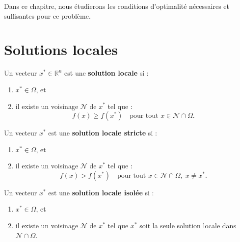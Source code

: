 Dans ce chapitre, nous étudierons les conditions d'optimalité nécessaires et suffisantes pour ce problème.

\section{Solutions locales}

\begin{definition}
Un vecteur $x^* \in \mathbb{R}^n$ est une \textbf{solution locale} si :
\begin{enumerate}
    \item $x^* \in \Omega$, et
    \item il existe un voisinage $\mathcal{N}$ de $x^*$ tel que :
    \begin{equation}
        f(x) \geq f(x^*) \quad \text{pour tout } x \in \mathcal{N} \cap \Omega.
    \end{equation}
\end{enumerate}
\end{definition}

\begin{definition}
Un vecteur $x^*$ est une \textbf{solution locale stricte} si :
\begin{enumerate}
    \item $x^* \in \Omega$, et
    \item il existe un voisinage $\mathcal{N}$ de $x^*$ tel que :
    \begin{equation}
        f(x) > f(x^*) \quad \text{pour tout } x \in \mathcal{N} \cap \Omega, \; x \neq x^*.
    \end{equation}
\end{enumerate}
\end{definition}

\begin{definition}
Un vecteur $x^*$ est une \textbf{solution locale isolée} si :
\begin{enumerate}
    \item $x^* \in \Omega$, et
    \item il existe un voisinage $\mathcal{N}$ de $x^*$ tel que $x^*$ soit la seule solution locale dans $\mathcal{N} \cap \Omega$.
\end{enumerate}
\end{definition}

